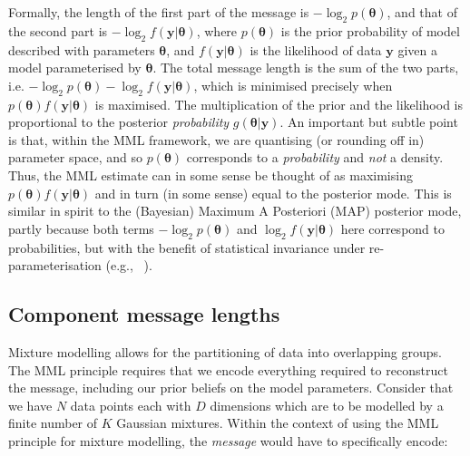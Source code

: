 \documentclass{elsarticle}
\newcommand{\vect}[1]{\boldsymbol{\mathbf{#1}}}
\renewcommand{\vec}[1]{\vect{#1}}
\def\datum{y}
\def\data{\vect{\datum}}
\newcommand{\prior}[1]{p\left(#1\right)}
\begin{document}
Formally, the length of the first part of the message is
    $-\log_{2}\prior{\vec{\theta}}$, 
and that of the second part is 
    $-\log_{2}f(\vec{\data}|\vec{\theta})$, 
where $\prior{\vec{\theta}}$ is the prior probability of model described with 
parameters $\vec{\theta}$, and 
    $f(\vec{\data}|\vec{\theta})$ 
is the likelihood of data $\vec{\data}$ given a model parameterised by $\vec{\theta}$. 
The total message length is the sum of the two parts, i.e. 
    $-\log_{2} \prior{\vec{\theta}} - \log_{2}f(\vec{\data} | \vec{\theta})$, 
which is minimised precisely when $\prior{\vec{\theta}} f(\vec{\data}|\vec{\theta})$
is maximised. The multiplication of the prior and the likelihood is 
proportional to the posterior {\em probability} $g(\vec{\theta}|\vec{\data})$. 
An important but subtle point is that, within the MML framework, we are 
quantising (or rounding off in) parameter space, and so 
$\prior{\vec{\theta}}$ corresponds to a {\em probability} and {\em not} 
a density. Thus, the MML estimate can in some sense be thought of as maximising 
    $\prior{\vec{\theta}}f(\vec{\data}|\vec{\theta})$ 
and in turn (in some sense) equal to the posterior mode. This is similar in 
spirit to the (Bayesian) Maximum A Posteriori (MAP) posterior mode, partly 
because both terms 
    $-\log_{2}\prior{\vec{\theta}}$
and 
    $\log_{2} f(\vec{\data}|\vec{\theta})$ 
here correspond to probabilities, but with the benefit of statistical 
invariance under re-parameterisation (e.g., ~\cite{WallaceFreeman1987,WallaceDowe1999a,Wallace:2005,dowe2007bayes}).


\subsection{Component message lengths}

Mixture modelling allows for the partitioning of data into overlapping groups.
The MML principle requires that we encode everything required to reconstruct 
the message, including our prior beliefs on the model parameters. Consider 
that we have $N$ data points each with $D$ dimensions which are to be modelled 
by a finite number of $K$ Gaussian mixtures. Within the context of using the 
MML principle for mixture modelling, the \emph{message} would have to 
specifically encode:
\end{document}
